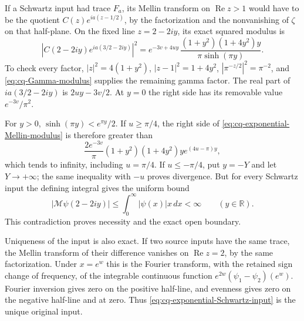 If a Schwartz input had trace $F_a$, its Mellin transform on
$\operatorname{Re}z>1$ would have to be the quotient
$C(z)e^{ia(z-1/2)}$, by the factorization and the nonvanishing
of $\zeta$ on that half-plane. On the fixed line $z=2-2iy$,
its exact squared modulus is
\begin{equation}\label{eq:cq-exponential-Mellin-modulus}
 \left|C(2-2iy)e^{ia(3/2-2iy)}\right|^2
 = e^{-3v+4uy}\,
       \frac{(1+y^2)(1+4y^2)y}{\pi\sinh(\pi y)}.
\end{equation}
To check every factor, $|z|^2=4(1+y^2)$,
$|z-1|^2=1+4y^2$, $|\pi^{-z/2}|^2=\pi^{-2}$,
and \eqref{eq:cq-Gamma-modulus} supplies the remaining gamma
factor. The real part of $ia(3/2-2iy)$ is $2uy-3v/2$.
At $y=0$ the right side has its removable value $e^{-3v}/\pi^2$.

For $y>0$, $\sinh(\pi y)<e^{\pi y}/2$.
If $u\geq\pi/4$, the right side of
\eqref{eq:cq-exponential-Mellin-modulus} is therefore greater
than
\[
 \frac{2e^{-3v}}{\pi}(1+y^2)(1+4y^2)y
                   e^{(4u-\pi)y},
\]
which tends to infinity, including $u=\pi/4$. If
$u\leq-\pi/4$, put $y=-Y$ and let $Y\to+\infty$; the
same inequality with $-u$ proves divergence. But for every
Schwartz input the defining integral gives the uniform bound
\[
 |\mathcal M\psi(2-2iy)|
 \leq\int_0^\infty|\psi(x)|x\,dx<\infty
 \qquad(y\in\mathbb R).
\]
This contradiction proves necessity and the exact open boundary.

Uniqueness of the input is also exact. If two source inputs have
the same trace, the Mellin transform of their difference vanishes
on $\operatorname{Re}z=2$, by the same factorization. Under
$x=e^w$ this is the Fourier transform, with the retained sign
change of frequency, of the integrable continuous function
$e^{2w}(\psi_1-\psi_2)(e^w)$. Fourier inversion gives zero
on the positive half-line, and evenness gives zero on the negative
half-line and at zero. Thus \eqref{eq:cq-exponential-Schwartz-input}
is the unique original input.

